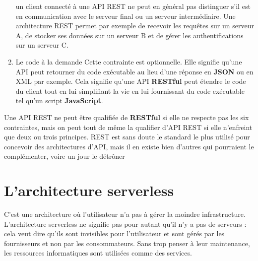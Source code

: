 \begin{enumerate}
un client connecté à une API REST ne peut en général pas distinguer
s’il est en communication avec le serveur final ou un serveur intermédiaire. Une architecture
REST permet par exemple de recevoir les requêtes sur un serveur A, de stocker ses données sur
un serveur B et de gérer les authentifications sur un serveur C.
        \item Le code à la demande
Cette contrainte est optionnelle. Elle signifie qu’une API peut retourner
du code exécutable au lieu d’une réponse en \textbf{JSON} ou en XML par exemple. Cela signifie qu’une
API \textbf{RESTful} peut étendre le code du client tout en lui simplifiant la vie en lui fournissant du
code exécutable tel qu’un script \textbf{JavaScript}.

\end{enumerate}

Une API REST ne peut être qualifiée de \textbf{RESTful} si elle ne respecte pas les six contraintes, mais on peut
tout de même la qualifier d’API REST si elle n’enfreint que deux ou trois principes. REST est sans doute le
standard le plus utilisé pour concevoir des architectures d’API, mais il en existe bien d’autres qui pourraient le complémenter, voire un jour le détrôner

\section{L’architecture serverless}
C’est une architecture où l’utilisateur n’a pas à gérer la moindre infrastructure. L’architecture serverless ne signifie pas pour autant qu’il n’y a pas de serveurs : cela veut dire qu’ils sont invisibles pour l’utilisateur et sont gérés par les fournisseurs et non par les consommateurs. Sans trop penser à leur maintenance, les ressources informatiques sont utilisées comme des services.
 
